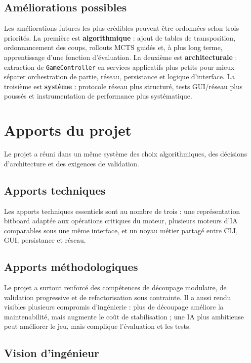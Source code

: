 \documentclass[a4paper]{article}
\begin{document}
\subsection{Améliorations possibles}

Les améliorations futures les plus crédibles peuvent être ordonnées selon trois priorités. La première est \textbf{algorithmique} : ajout de tables de transposition, ordonnancement des coups, rollouts MCTS guidés et, à plus long terme, apprentissage d'une fonction d'évaluation. La deuxième est \textbf{architecturale} : extraction de \texttt{GameController} en services applicatifs plus petits pour mieux séparer orchestration de partie, réseau, persistance et logique d'interface. La troisième est \textbf{système} : protocole réseau plus structuré, tests GUI/réseau plus poussés et instrumentation de performance plus systématique.

\section{Apports du projet}

Le projet a réuni dans un même système des choix algorithmiques, des décisions d'architecture et des exigences de validation.

\subsection{Apports techniques}

Les apports techniques essentiels sont au nombre de trois : une représentation bitboard adaptée aux opérations critiques du moteur, plusieurs moteurs d'IA comparables sous une même interface, et un noyau métier partagé entre CLI, GUI, persistance et réseau.

\subsection{Apports méthodologiques}

Le projet a surtout renforcé des compétences de découpage modulaire, de validation progressive et de refactorisation sous contrainte. Il a aussi rendu visibles plusieurs compromis d'ingénierie : plus de découpage améliore la maintenabilité, mais augmente le coût de stabilisation ; une IA plus ambitieuse peut améliorer le jeu, mais complique l'évaluation et les tests.

\subsection{Vision d'ingénieur}
\end{document}
